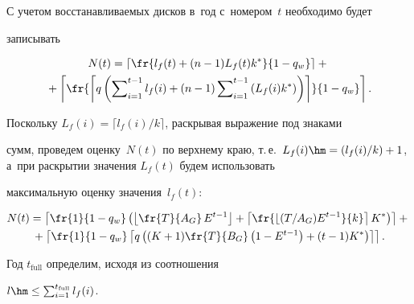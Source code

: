   


  С учетом восстанавливаемых дисков в~год с~номером~$t$ необходимо будет 


записывать





\noindent


\begin{multline*}


  N(t)= \left\lceil \fr{l_f(t)+(n-1)L_f(t)k^*}{1-q_w}\right\rceil + {}\\


  {}+\left\lceil


   \fr{\left\lceil q \left( \sum\nolimits_{i=1}^{t-1} l_f(i)+(n-1)\sum\nolimits_{i=1}^{t-1} 


   \left(L_f(i)k^*\right)\right)\right\rceil}{1-q_w}\right\rceil.


\end{multline*}


  


  Поскольку $L_f(i)= \lceil l_f(i)/k\rceil$, раскрывая выражение под знаками 


сумм, проведем оценку~$N(t)$ по верхнему краю, т.\,е.\ $L_f(i)\hm= 


(l_f(i)/k)+1$, а~при раскрытии значения $L_f(t)$ будем использовать 


максимальную оценку значения~$l_f(t)$:





\noindent


 \begin{multline*}


  N(t)= \left\lceil \fr{1}{1-q_w}\left( \left\lfloor \fr{T}{A_G}\,E^{t-1}\right\rfloor 


+\left\lceil \fr{\lfloor (T/A_G)E^{t-1}}{k}\right\rceil K^*\right) \right\rceil+ {}\\


{}+


  \left\lceil \fr{1}{1-q_w}\left\lceil q\left((K+1)\fr{T}{B_G}\left(1-E^{t-1}\right) +(t-1) 


K^*\right) \right\rceil\right\rceil.


\end{multline*}


  


  Год $t_{\mathrm{full}}$ определим, исходя из соотношения


  $l\hm\leq \sum\nolimits_{i=1}^{t_{\mathrm{full}}} l_f(i)$. 


